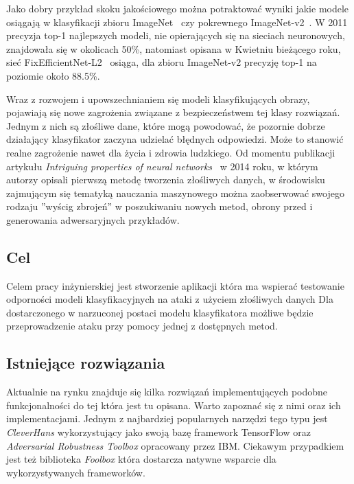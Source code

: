 \documentclass[
    left=2.5cm,         %
    right=2.5cm,        %
    top=2.5cm,          %
    bottom=3cm,         %
    bindingoffset=6mm,  %
    nohyphenation=false %
]{eiti/eiti-thesis}
\begin{document}
Jako dobry przykład skoku jakościowego można potraktować wyniki jakie modele osiągają w klasyfikacji zbioru ImageNet~\cite{ILSVRC15} czy pokrewnego ImageNet-v2~\cite{DBLP:journals/corr/abs-1902-10811}.
W 2011 precyzja top-1 najlepszych modeli, nie opierających się na sieciach neuronowych, znajdowała się w okolicach 50\%, natomiast
opisana w Kwietniu bieżącego roku, sieć FixEfficientNet-L2~\cite{Touvron2020FixingTT} osiąga, dla zbioru ImageNet-v2 precyzję top-1 na poziomie około 88.5\%.

Wraz z rozwojem i upowszechnianiem się modeli klasyfikujących obrazy,
pojawiają się nowe zagrożenia związane z bezpieczeństwem tej klasy rozwiązań.
Jednym z nich są złośliwe dane, które mogą powodować,
że pozornie dobrze działający klasyfikator zaczyna udzielać błędnych odpowiedzi.
Może to stanowić realne zagrożenie nawet dla życia i zdrowia ludzkiego.
Od momentu publikacji artykułu \textit{Intriguing properties of neural networks}~\cite{DBLP:journals/corr/SzegedyZSBEGF13} w 2014 roku,
w którym autorzy opisali pierwszą metodę tworzenia złośliwych danych, w środowisku zajmującym się tematyką nauczania maszynowego można zaobserwować swojego rodzaju
''wyścig zbrojeń'' w poszukiwaniu nowych metod, obrony przed i generowania adwersaryjnych przykładów.

\subsection{Cel}
\label{sec:target}

Celem pracy inżynierskiej jest stworzenie aplikacji która ma wspierać testowanie
odporności modeli klasyfikacyjnych na ataki z użyciem złośliwych danych
Dla dostarczonego w narzuconej postaci modelu klasyfikatora możliwe będzie
przeprowadzenie ataku przy pomocy jednej z dostępnych metod.

\subsection{Istniejące rozwiązania}

Aktualnie na rynku znajduje się kilka rozwiązań implementujących podobne funkcjonalności
do tej która jest tu opisana. Warto zapoznać się z nimi oraz ich implementacjami.
Jednym z najbardziej popularnych narzędzi tego typu jest \textit{CleverHans}\cite{DBLP:journals/corr/GoodfellowPM16}
wykorzystujący jako swoją bazę framework TensorFlow oraz \textit{Adversarial Robustness Toolbox}\cite{DBLP:journals/corr/abs-1807-01069} opracowany przez IBM.
Ciekawym przypadkiem jest też biblioteka \textit{Foolbox}\cite{rauber2017foolbox} która dostarcza natywne wsparcie dla wykorzystywanych frameworków.
\end{document}
